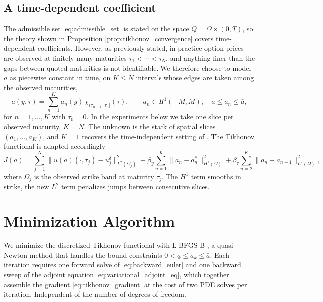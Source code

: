 \subsection{A time-dependent coefficient}\label{sec:time_dependent_a}

The admissible set \eqref{eq:admissible_set} is stated on the space $Q = \Omega\times(0,T)$,
so the theory shown in Proposition \ref{prop:tikhonov_convergence} covers time-dependent coefficients.
However, as previously stated,
in practice option prices are observed at finitely many maturities $\tau_1 < \cdots < \tau_N$,
and anything finer than the gaps between quoted maturities is not identifiable.
We therefore choose to model $a$ as piecewise constant in time,
on $K \le N$ intervals whose edges are taken among the observed maturities,
\begin{equation}\label{eq:coefficient_slices}
    a(y,\tau) = \sum_{n=1}^{K} a_n(y)\,\chi_{(\tau_{n-1},\,\tau_n]}(\tau),
    \qquad a_n \in H^1(-M,M), \quad \underline{a} \le a_n \le \bar a,
\end{equation}
for $n = 1,\dots,K$ with $\tau_0 = 0$.
In the experiments below we take one slice per observed maturity, $K = N$.
The unknown is the stack of spatial slices $(a_1, \dots, a_K)$,
and $K = 1$ recovers the time-independent setting of \cite{egger2005tikhonov}.
The Tikhonov functional is adapted accordingly
\begin{equation}\label{eq:surface_functional}
    J(a) = \sum_{j=1}^{N} \bigl\| u(a)(\cdot,\tau_j) - u^\delta_j \bigr\|^2_{L^2(\Omega_j)}
         + \beta_y \sum_{n=1}^{K} \| a_n - a^*_n \|^2_{H^1(\Omega)}
         + \beta_\tau \sum_{n=2}^{K} \| a_n - a_{n-1} \|^2_{L^2(\Omega)},
\end{equation}
where $\Omega_j$ is the observed strike band at maturity $\tau_j$.
The $H^1$ term smooths in strike,
the new $L^2$ term penalizes jumps between consecutive slices.

\section{Minimization Algorithm}

We minimize the discretized Tikhonov functional with L-BFGS-B \cite{byrd_lbfgsb},
a quasi-Newton method that handles the bound constraints $0 < \underline{a} \le a_k \le \bar a$.
Each iteration requires one forward solve of \eqref{eq:backward_euler} and one backward sweep of the adjoint equation \eqref{eq:variational_adjoint_eq},
which together assemble the gradient \eqref{eq:tikhonov_gradient} at the cost of two PDE solves per iteration.
Independent of the number of degrees of freedom.

